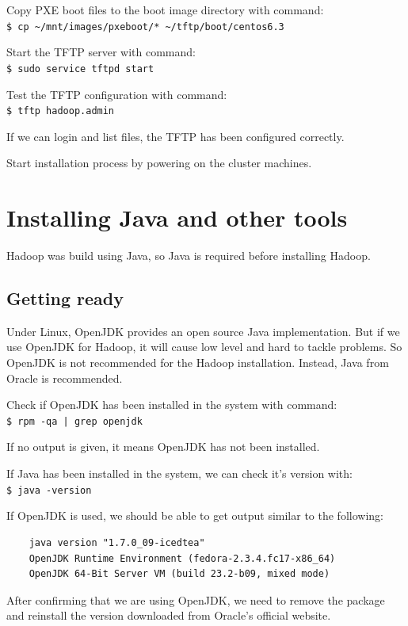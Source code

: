 Copy PXE boot files to the boot image directory with command: \\
\verb|$ cp ~/mnt/images/pxeboot/* ~/tftp/boot/centos6.3|

Start the TFTP server with command: \\
\verb|$ sudo service tftpd start|

Test the TFTP configuration with command: \\
\verb|$ tftp hadoop.admin|

If we can login and list files, the TFTP has been configured correctly.

Start installation process by powering on the cluster machines.

\section{Installing Java and other tools}
Hadoop was build using Java, so Java is required before installing Hadoop.

\subsection*{Getting ready}
Under Linux, OpenJDK provides an open source Java implementation. But if we use OpenJDK for Hadoop, it will cause low level and hard to tackle problems. So OpenJDK is not recommended for the Hadoop installation. Instead, Java from Oracle is recommended.

Check if OpenJDK has been installed in the system with command: \\
\verb+$ rpm -qa | grep openjdk+

If no output is given, it means OpenJDK has not been installed.

If Java has been installed in the system, we can check it's version with: \\
\verb|$ java -version|

If OpenJDK is used, we should be able to get output similar to the following:

\begin{verbatim}
    java version "1.7.0_09-icedtea"
    OpenJDK Runtime Environment (fedora-2.3.4.fc17-x86_64)
    OpenJDK 64-Bit Server VM (build 23.2-b09, mixed mode)
\end{verbatim}

After confirming that we are using OpenJDK, we need to remove the package and reinstall the version downloaded from Oracle's official website.


